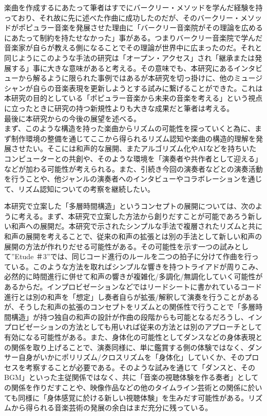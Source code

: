 \documentclass[uplatex,dvipdfmx]{ujarticle}
\begin{document}
楽曲を作成するにあたって筆者はすでにバークリー・メソッドを学んだ経験を持っており、それ故に先に述べた作曲に成功したのだが、そのバークリー・メソッドがポピュラー音楽を発展させた理由に「バークリー音楽院がその理論を広めるにあたって制約を持たせなかった」事がある。つまりバークリー音楽院で学んだ音楽家が自らが教える側になることでその理論が世界中に広まったのだ。それと同じようにこのような手法の研究は「オープン・アクセス」され「継承または発展する」事に大きな意味があると考える。その意味でも、本研究にあるインタビューから解るように限られた事例ではあるが本研究を切っ掛けに、他のミュージシャンが自らの音楽表現を更新しようとする試みに繋げることができた。これは本研究の目的としている「ポピュラー音楽から未来の音楽を考える」という視点に立ったときに研究の持つ新規性よりも大きな成果だと筆者は考える。\\

最後に本研究からの今後の展望を述べる。\\

まず、このような構造を持った楽曲からリズムの可能性を探っていくと為に、まず制作環境の整備を通じてここから得られるリズム認知や楽曲の構造的理解を発展させたい。そこには和声的な展開、またアルゴリズム化やAIなどを持ちいたコンピューターとの共創や、そのような環境を「演奏者や共作者として迎える」などが加わる可能性が考えられる。また、引続き今回の演奏者などとの演奏活動を行うことや、他ジャンルの演奏者へのインタビューやコラボレーションを通じて、リズム認知についての考察を継続したい。

本研究で立案した「多層時間構造」というコンセプトの展開については、次のように考える。まず、本研究で立案した方法から創りだすことが可能であろう新しい和声への展開だ。本研究で示されたシンプルな手法で複層されたリズムと共に和声の展開を考えることで、従来の和声の拡張とは別の手法として新しい和声の展開の方法が作れりだせる可能性がある。その可能性を示す一つの試みとして''Etude ＃3''では、同じコード進行のルールを二つの拍子に分けて作曲を行っている。このような方法を取ればシンプルな響きを持つトライアドが周りこみ、必然的に時間進行に併せて和声の響きが複雑化/多調化/無調化していく可能性があるからだ。インプロビゼーションなどではリードシートに書かれているコード進行とは別の和声を「想定」し奏者自らが拡張/解釈して演奏を行うことがあるが、そうした和声の拡張のコンセプトをリズムとの関係性で行うことで「多層時間構造」が持つ独自の和声の設計が作曲の段階からも可能となるだろうし、インプロビゼーションの方法としても用いれば従来の方法とは別のアプローチとして有効になる可能性がある。また、身体化の可能性としてダンスなどの身体表現との関係を取り上げることで、演奏同様に、単に鑑賞する側の体験ではなく、ダンサー自身がいかにポリリズム/クロスリズムを「身体化」していくか、そのプロセスを考察することが必要である。そのような試みを通じて「ダンスと、そのBGM」といった主従関係ではなく、共に「音楽の視聴体験を作る奏者」としての関係を作りだすことや、映像作品などの他のタイムライン芸術との関係に於いても同様に「身体感覚に於ける新しい視聴体験」を生みだす可能性がある。リズムから得られる音楽芸術の発展の余白はまだ充分に残っている。
\end{document}
